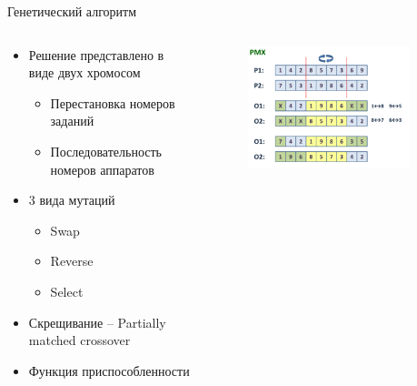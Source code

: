 \documentclass{beamer}
\begin{document}
\begin{frame}{Генетический алгоритм}
\begin{columns}[onlytextwidth]
    \begin{column}{0.6\textwidth}
        \begin{itemize}
            \item Решение представлено в виде двух хромосом
            \begin{itemize}
            \item Перестановка номеров заданий
            \item Последовательность номеров аппаратов
            \end{itemize}

            \item 3 вида мутаций
            \begin{itemize}
            \item Swap
            \item Reverse
            \item Select
            \end{itemize}

            \item Скрещивание -- Partially matched crossover
            \item Функция приспособленности
        \end{itemize}

    \end{column}
    \begin{column}{0.4\textwidth}

        \begin{figure}[here]
            \includegraphics[scale=0.5]{images/300px-Pmx.png}
        \end{figure}
    \end{column}

​\end{columns}
\end{frame}
\end{document}
